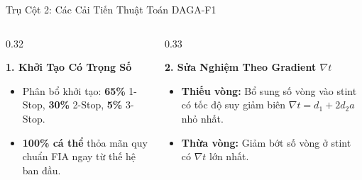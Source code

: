 \documentclass[aspectratio=169, 10pt]{beamer}
\begin{document}
\begin{frame}{Trụ Cột 2: Các Cải Tiến Thuật Toán DAGA-F1}
  \begin{columns}[T]
    \begin{column}{0.32\textwidth}
      \begin{block}{\centering \textbf{1. Khởi Tạo Có Trọng Số}}
        \scriptsize
        \begin{itemize}
          \item Phân bổ khởi tạo: \textbf{65\%} 1-Stop, \textbf{30\%} 2-Stop, \textbf{5\%} 3-Stop.
          \item \textbf{100\% cá thể} thỏa mãn quy chuẩn FIA ngay từ thế hệ ban đầu.
        \end{itemize}
        \vspace{0.15cm}
        \centering
      \end{block}
    \end{column}

    \begin{column}{0.33\textwidth}
      \begin{alertblock}{\centering \textbf{2. Sửa Nghiệm Theo Gradient $\nabla t$}}
        \scriptsize
        \begin{itemize}
          \item \textbf{Thiếu vòng:} Bổ sung số vòng vào stint có tốc độ suy giảm biên $\nabla t = d_1 + 2d_2 a$ nhỏ nhất.
          \item \textbf{Thừa vòng:} Giảm bớt số vòng ở stint có $\nabla t$ lớn nhất.
        \end{itemize}
        \vspace{0.08cm}
        \centering
      \end{alertblock}
    \end{column}


\end{columns}
\end{frame}
\end{document}

